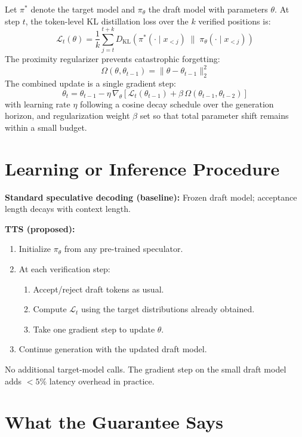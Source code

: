 \documentclass[10pt,twocolumn]{article}
\begin{document}
Let $\pi^*$ denote the target model and $\pi_\theta$ the draft model with
parameters $\theta$. At step $t$, the token-level KL distillation loss over
the $k$ verified positions is:
\[
\mathcal{L}_t(\theta)
  = \frac{1}{k}\sum_{j=t}^{t+k} D_{\text{KL}}\!\left(
    \pi^*(\cdot \mid x_{<j}) \;\|\; \pi_\theta(\cdot \mid x_{<j})
  \right)
\]
The proximity regularizer prevents catastrophic forgetting:
\[
\Omega(\theta, \theta_{t-1}) = \|\theta - \theta_{t-1}\|_2^2
\]
The combined update is a single gradient step:
\[
\theta_t = \theta_{t-1} - \eta\,\nabla_\theta\!\left[
  \mathcal{L}_t(\theta_{t-1}) + \beta\,\Omega(\theta_{t-1}, \theta_{t-2})
\right]
\]
with learning rate $\eta$ following a cosine decay schedule over the
generation horizon, and regularization weight $\beta$ set so that total
parameter shift remains within a small budget.

\section{Learning or Inference Procedure}

\textbf{Standard speculative decoding (baseline):}
Frozen draft model; acceptance length decays with context length.

\textbf{TTS (proposed):}
\begin{enumerate}[itemsep=2pt,parsep=0pt]
  \item Initialize $\pi_\theta$ from any pre-trained speculator.
  \item At each verification step:
    \begin{enumerate}[label=(\alph*),itemsep=1pt,parsep=0pt]
      \item Accept/reject draft tokens as usual.
      \item Compute $\mathcal{L}_t$ using the target distributions already
        obtained.
      \item Take one gradient step to update $\theta$.
    \end{enumerate}
  \item Continue generation with the updated draft model.
\end{enumerate}

No additional target-model calls. The gradient step on the small draft model
adds $< 5\%$ latency overhead in practice.

\section{What the Guarantee Says}
\end{document}
